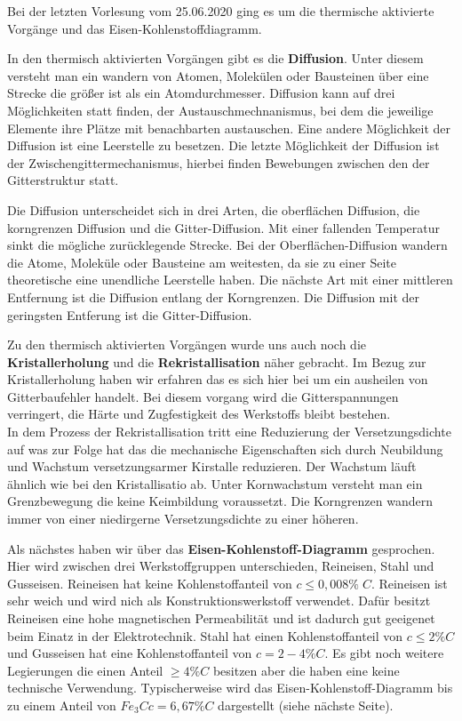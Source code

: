 \documentclass[12pt]{scrreprt}
\begin{document}
Bei der letzten Vorlesung vom 25.06.2020 ging es um die thermische aktivierte Vorgänge und das Eisen-Kohlenstoffdiagramm.\medskip

In den thermisch aktivierten Vorgängen gibt es die \textbf{Diffusion}. Unter diesem versteht man ein wandern von Atomen, Molekülen oder Bausteinen über eine Strecke die größer ist als ein Atomdurchmesser.
Diffusion kann auf drei Möglichkeiten statt finden, der Austauschmechnanismus, bei dem die jeweilige Elemente ihre Plätze mit benachbarten austauschen.
Eine andere Möglichkeit der Diffusion ist eine Leerstelle zu besetzen. Die letzte Möglichkeit der Diffusion ist der Zwischengittermechanismus, hierbei finden Bewebungen zwischen den der Gitterstruktur statt.\smallskip

Die Diffusion unterscheidet sich in drei Arten, die oberflächen Diffusion, die korngrenzen Diffusion und die Gitter-Diffusion. Mit einer fallenden Temperatur sinkt die mögliche zurücklegende Strecke. Bei der Oberflächen-Diffusion wandern die Atome, Moleküle oder Bausteine am weitesten, da sie zu einer Seite theoretische eine unendliche Leerstelle haben.
Die nächste Art mit einer mittleren Entfernung ist die Diffusion entlang der Korngrenzen. Die Diffusion mit der geringsten Entferung ist die Gitter-Diffusion.\medskip

Zu den thermisch aktivierten Vorgängen wurde uns auch noch die \textbf{Kristallerholung} und die \textbf{Rekristallisation} näher gebracht. 
Im Bezug zur Kristallerholung haben wir erfahren das es sich hier bei um ein ausheilen von Gitterbaufehler handelt.
Bei diesem vorgang wird die Gitterspannungen verringert, die Härte und Zugfestigkeit des Werkstoffs bleibt bestehen. \\
In dem Prozess der Rekristallisation tritt eine Reduzierung der Versetzungsdichte auf was zur Folge hat das die mechanische Eigenschaften sich durch Neubildung und Wachstum versetzungsarmer Kirstalle reduzieren. Der Wachstum läuft ähnlich wie bei den Kristallisatio ab.
Unter Kornwachstum versteht man ein Grenzbewegung die keine Keimbildung voraussetzt. Die Korngrenzen wandern immer von einer niedirgerne Versetzungsdichte zu einer höheren.\bigskip

Als nächstes haben wir über das \textbf{Eisen-Kohlenstoff-Diagramm} gesprochen. Hier wird zwischen drei Werkstoffgruppen unterschieden, Reineisen, Stahl und Gusseisen. 
Reineisen hat keine Kohlenstoffanteil von \(c \leq 0,008\% \;C\). Reineisen ist sehr weich und wird nich als Konstruktionswerkstoff verwendet. Dafür besitzt Reineisen eine hohe magnetischen Permeabilität und ist dadurch gut geeigenet beim Einatz in der Elektrotechnik.
Stahl hat einen Kohlenstoffanteil von \(c \leq 2\%C\) und Gusseisen hat eine Kohlenstoffanteil von \(c = 2 - 4\%C\). Es gibt noch weitere Legierungen die einen Anteil \(\geq 4\%C\) besitzen aber die haben eine keine technische Verwendung.
Typischerweise wird das Eisen-Kohlenstoff-Diagramm bis zu einem Anteil von \(Fe_3C c=6,67\%C\) dargestellt (siehe nächste Seite).\smallskip
\end{document}
